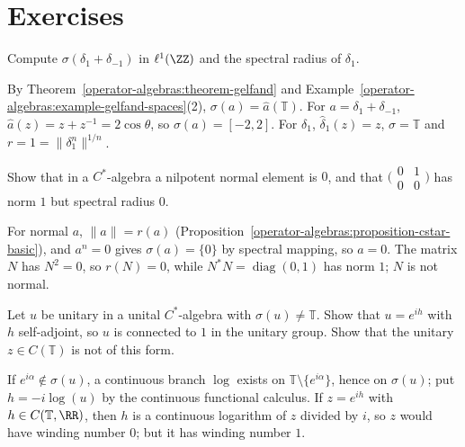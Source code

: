 \section{Exercises}\label{operator-algebras:section-exercises}

\begin{exercise}\label{operator-algebras:exercise-spectrum-ell-one}
Compute $\sigma(\delta_1 + \delta_{-1})$ in $\ell^1(\ZZ)$ and the spectral radius of $\delta_1$.
\end{exercise}

\begin{solution}
By Theorem~\ref{operator-algebras:theorem-gelfand} and Example~\ref{operator-algebras:example-gelfand-spaces}(2), $\sigma(a) = \hat a(\mathbb{T})$. For $a = \delta_1 + \delta_{-1}$, $\hat a(z) = z + z^{-1} = 2\cos\theta$, so $\sigma(a) = [-2, 2]$.
For $\delta_1$, $\hat\delta_1(z) = z$, $\sigma = \mathbb{T}$ and $r = 1 = \|\delta_1^n\|^{1/n}$.
\end{solution}

\begin{exercise}\label{operator-algebras:exercise-nilpotent-not-cstar}
Show that in a $C^*$-algebra a nilpotent normal element is $0$, and that $\bigl(\begin{smallmatrix}0 & 1\\ 0 & 0\end{smallmatrix}\bigr)$ has norm $1$ but spectral radius $0$.
\end{exercise}

\begin{solution}
For normal $a$, $\|a\| = r(a)$ (Proposition~\ref{operator-algebras:proposition-cstar-basic}), and $a^n = 0$ gives $\sigma(a) = \{0\}$ by spectral mapping, so $a = 0$. The matrix $N$ has $N^2 = 0$, so $r(N) = 0$, while $N^*N = \operatorname{diag}(0, 1)$ has
norm $1$; $N$ is not normal.
\end{solution}

\begin{exercise}\label{operator-algebras:exercise-unitary-exponential}
Let $u$ be unitary in a unital $C^*$-algebra with $\sigma(u) \neq \mathbb{T}$. Show that $u = e^{ih}$ with $h$ self-adjoint, so $u$ is connected to $1$ in the unitary group. Show that the unitary $z \in C(\mathbb{T})$ is not of this form.
\end{exercise}

\begin{solution}
If $e^{i\alpha} \notin \sigma(u)$, a continuous branch $\log$ exists on $\mathbb{T} \setminus \{e^{i\alpha}\}$, hence on $\sigma(u)$; put $h = -i\log(u)$ by the continuous functional calculus. If $z = e^{ih}$ with $h \in C(\mathbb{T}, \RR)$, then $h$ is a
continuous logarithm of $z$ divided by $i$, so $z$ would have winding number $0$; but it has winding number $1$.
\end{solution}

